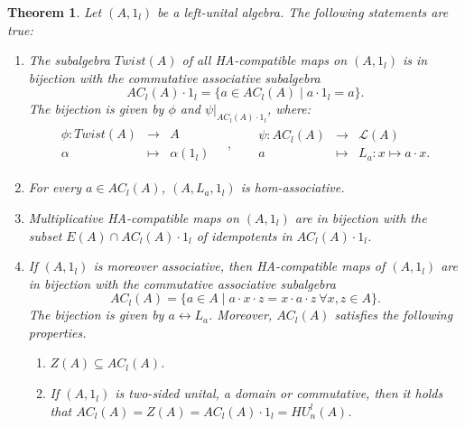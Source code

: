 \documentclass[12pt]{article}
\newtheorem{theorem}{Theorem}
\begin{document}
		
		\begin{theorem}\label{thm:bijection_left_unital}
			Let $(A,1_l)$ be a left-unital algebra. The following statements are true:
			\begin{enumerate}[label=\textnormal{(B\arabic*):},ref=\textnormal{(B\arabic*)}]
				\item\label{item:HAstr_B1} The subalgebra $Twist(A)$ of all HA-compatible maps on $(A,1_l)$ is in bijection with the commutative associative subalgebra
				\begin{equation*}
					AC_l(A)\cdot 1_l=\{a\in AC_l(A)\mid a\cdot 1_l=a\}.
                \end{equation*}
				The bijection is given by $\phi$ and $\psi\vert_{AC_l(A)\cdot 1_l}$, where:
				\begin{align*}
					\begin{array}{ccc}
						\phi:Twist(A)& \to &   A    \\
						\alpha & \mapsto & \alpha(1_l)
					\end{array}\quad  ,
					&&
					\begin{array}{ccc}
						\psi:AC_l(A)& \to &  \mathcal{L}(A)   \\
						a & \mapsto & L_a\colon x\mapsto a\cdot x.
					\end{array}
				\end{align*}
				\item\label{item:HAstr_B2} For every $a\in AC_l(A)$,  $(A,L_a,1_l)$ is hom-associative.
				\item\label{item:HAstr_B3} Multiplicative HA-compatible maps on $(A,1_l)$ are in bijection with the subset $E(A)\cap AC_l(A)\cdot 1_l$ of idempotents in $AC_l(A)\cdot 1_l$.
				\item\label{item:HAstr_B4} If $(A,1_l)$ is moreover associative, then HA-compatible maps of $(A,1_l)$ are in bijection with the commutative associative subalgebra
				\begin{equation}
					AC_l(A)=\{a\in A \mid a\cdot x\cdot z=x\cdot a\cdot z\ \forall x,z\in A \}.
				\end{equation}
				The bijection is given by $a\leftrightarrow L_a$. Moreover, $AC_l(A)$ satisfies the following properties.
				\begin{enumerate}[label=\textnormal{\arabic*)}]
					\item\label{item:HAstr_B41} $Z(A)\subseteq AC_l(A)$.
					\item\label{item:HAstr_B42} If $(A,1_l)$ is two-sided unital, a domain or commutative, then it holds that $AC_l(A)=Z(A)=AC_l(A)\cdot 1_l=HU_n^l(A)$.
				\end{enumerate}
			\end{enumerate}
		\end{theorem}
		
\end{document}
